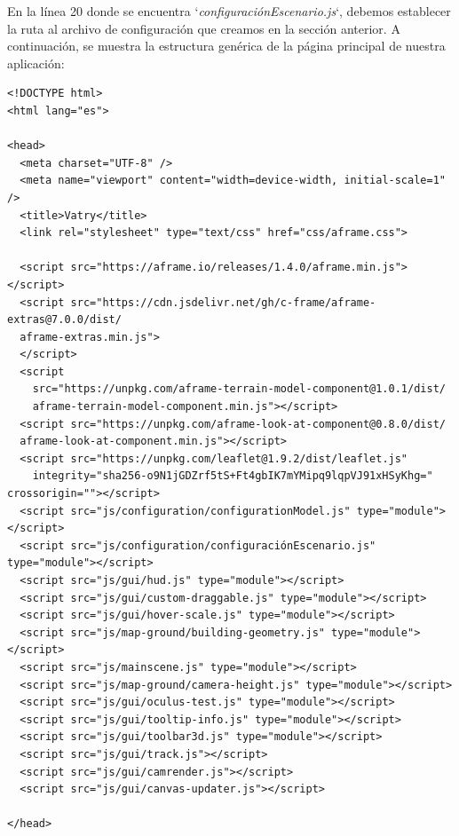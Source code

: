 \documentclass[a4paper, 11pt]{book}
\begin{document}
En la línea 20 donde se encuentra `\emph{configuraciónEscenario.js}`, debemos establecer la ruta al archivo de configuración que creamos en la sección anterior. A continuación, se muestra la estructura genérica de la página principal de nuestra aplicación:
\begin{verbatim}
<!DOCTYPE html>
<html lang="es">

<head>
  <meta charset="UTF-8" />
  <meta name="viewport" content="width=device-width, initial-scale=1" />
  <title>Vatry</title>
  <link rel="stylesheet" type="text/css" href="css/aframe.css">

  <script src="https://aframe.io/releases/1.4.0/aframe.min.js"></script>
  <script src="https://cdn.jsdelivr.net/gh/c-frame/aframe-extras@7.0.0/dist/
  aframe-extras.min.js">
  </script>
  <script
    src="https://unpkg.com/aframe-terrain-model-component@1.0.1/dist/
    aframe-terrain-model-component.min.js"></script>
  <script src="https://unpkg.com/aframe-look-at-component@0.8.0/dist/
  aframe-look-at-component.min.js"></script>
  <script src="https://unpkg.com/leaflet@1.9.2/dist/leaflet.js"
    integrity="sha256-o9N1jGDZrf5tS+Ft4gbIK7mYMipq9lqpVJ91xHSyKhg=" crossorigin=""></script>
  <script src="js/configuration/configurationModel.js" type="module"></script>
  <script src="js/configuration/configuraciónEscenario.js" type="module"></script>
  <script src="js/gui/hud.js" type="module"></script>
  <script src="js/gui/custom-draggable.js" type="module"></script>
  <script src="js/gui/hover-scale.js" type="module"></script>
  <script src="js/map-ground/building-geometry.js" type="module"></script>
  <script src="js/mainscene.js" type="module"></script>
  <script src="js/map-ground/camera-height.js" type="module"></script>
  <script src="js/gui/oculus-test.js" type="module"></script>
  <script src="js/gui/tooltip-info.js" type="module"></script>
  <script src="js/gui/toolbar3d.js" type="module"></script>
  <script src="js/gui/track.js"></script>
  <script src="js/gui/camrender.js"></script>
  <script src="js/gui/canvas-updater.js"></script>

</head>


\end{verbatim}
\end{document}
